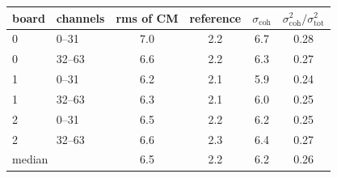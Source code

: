 \begin{tabular}{llcccc}
\toprule
board & channels & rms of CM & reference & $\sigma_\mathrm{coh}$ & $\sigma_\mathrm{coh}^2/\sigma_\mathrm{tot}^2$ \\
\midrule
0 & 0--31 & 7.0 & 2.2 & 6.7 & 0.28 \\
0 & 32--63 & 6.6 & 2.2 & 6.3 & 0.27 \\
1 & 0--31 & 6.2 & 2.1 & 5.9 & 0.24 \\
1 & 32--63 & 6.3 & 2.1 & 6.0 & 0.25 \\
2 & 0--31 & 6.5 & 2.2 & 6.2 & 0.25 \\
2 & 32--63 & 6.6 & 2.3 & 6.4 & 0.27 \\
\midrule
\multicolumn{2}{l}{median} & 6.5 & 2.2 & 6.2 & 0.26 \\
\bottomrule
\end{tabular}
